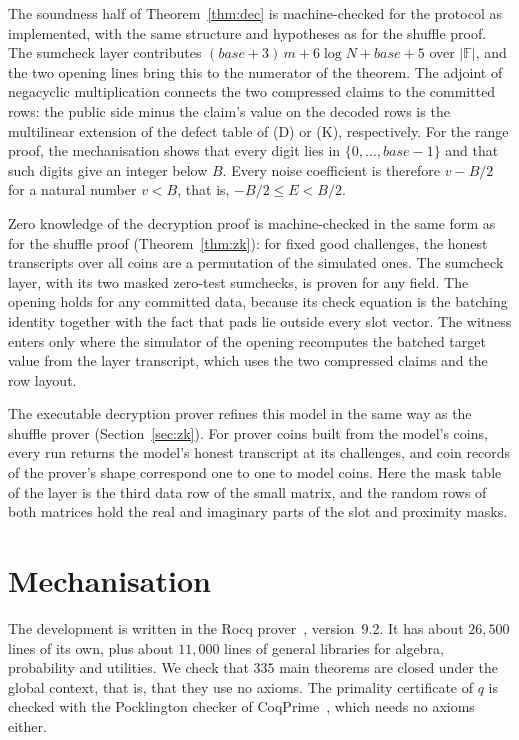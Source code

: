 \documentclass[sigconf,anonymous]{acmart}
\newcommand{\F}{\mathbb{F}}
\begin{document}
The soundness half of Theorem~\ref{thm:dec} is machine-checked for the protocol as implemented, with
the same structure and hypotheses as for the shuffle proof. The sumcheck layer contributes
$(\mathit{base}+3)\,m+6\log N+\mathit{base}+5$ over $|\F|$, and the two opening lines bring this to the
numerator of the theorem. The adjoint of negacyclic multiplication connects the two compressed
claims to the committed rows: the public side minus the claim's value on the decoded rows is the
multilinear extension of the defect table of (D) or (K), respectively. For the range proof, the
mechanisation shows that every digit lies in $\{0,\dots,\mathit{base}-1\}$ and that such digits
give an integer below $B$. Every noise coefficient is therefore $v-B/2$ for a natural number $v<B$,
that is, $-B/2\le E<B/2$.

Zero knowledge of the decryption proof is machine-checked in the same form as for the shuffle proof
(Theorem~\ref{thm:zk}): for fixed good challenges, the honest transcripts over all coins are a
permutation of the simulated ones. The sumcheck layer, with its two masked zero-test sumchecks, is
proven for any field. The opening holds for any committed data, because its check equation is the
batching identity together with the fact that pads lie outside every slot vector. The witness enters
only where the simulator of the opening recomputes the batched target value from the layer
transcript, which uses the two compressed claims and the row layout.

The executable decryption prover refines this model in the same way as the shuffle prover
(Section~\ref{sec:zk}). For prover coins built from the model's coins, every run returns the model's
honest transcript at its challenges, and coin records of the prover's shape correspond one to one to
model coins. Here the mask table of the layer is the third data row of the small matrix, and the
random rows of both matrices hold the real and imaginary parts of the slot and proximity masks.

\section{Mechanisation}
\label{sec:mech}

The development is written in the Rocq prover~\cite{Rocq}, version~9.2. It has about $26{,}500$
lines of its own, plus about $11{,}000$ lines of general libraries for algebra, probability and
utilities. We check that $335$ main theorems are closed under the global context, that is, that they
use no axioms. The primality certificate of $q$ is checked with the Pocklington checker of
CoqPrime~\cite{GTW06}, which needs no axioms either.
\end{document}
